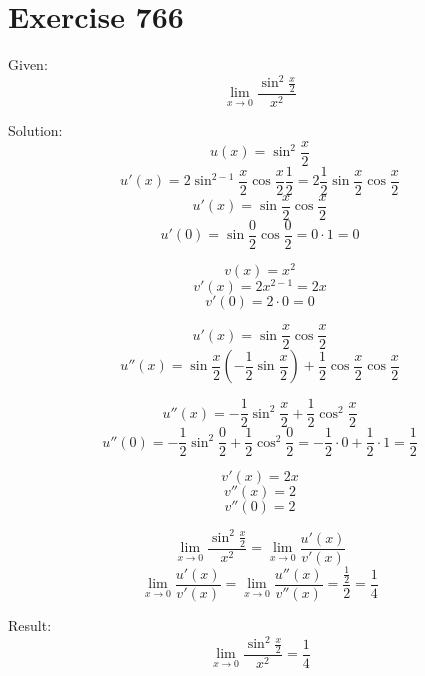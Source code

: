 \documentclass[a4paper, 10pt]{scrartcl}
\begin{document}
\section{Exercise 766}

Given:
\[\lim_{x\to 0}{\frac{\sin^{2}{\frac{x}{2}}}{x^{2}}}\]

Solution:
\[u(x) = \sin^{2}{\frac{x}{2}}\]
\[u'(x) = 2\sin^{2-1}{\frac{x}{2}}\cos{\frac{x}{2}}\frac{1}{2} =
          2\frac{1}{2}\sin{\frac{x}{2}}\cos{\frac{x}{2}}\]
\[u'(x) = \sin{\frac{x}{2}}\cos{\frac{x}{2}}\]
\[u'(0) = \sin{\frac{0}{2}}\cos{\frac{0}{2}} = 0\cdot 1 = 0\]

\[v(x) = x^{2}\]
\[v'(x) = 2x^{2-1} = 2x\]
\[v'(0) = 2\cdot 0 = 0\]

\[u'(x) = \sin{\frac{x}{2}}\cos{\frac{x}{2}}\]
\[u''(x) = \sin{\frac{x}{2}}(-\frac{1}{2}\sin{\frac{x}{2}}) +
           \frac{1}{2}\cos{\frac{x}{2}}\cos{\frac{x}{2}}\]

\[u''(x) = -\frac{1}{2}\sin^{2}{\frac{x}{2}} + \frac{1}{2}\cos^{2}{\frac{x}{2}}\]
\[u''(0) = -\frac{1}{2}\sin^{2}{\frac{0}{2}} + \frac{1}{2}\cos^{2}{\frac{0}{2}} =
           -\frac{1}{2}\cdot 0 + \frac{1}{2}\cdot 1 = \frac{1}{2}\]

\[v'(x) = 2x\]
\[v''(x) = 2\]
\[v''(0) = 2\]

\[\lim_{x\to 0}{\frac{\sin^{2}{\frac{x}{2}}}{x^{2}}} = \lim_{x\to 0}{\frac{u'(x)}{v'(x)}}\]
\[\lim_{x\to 0}{\frac{u'(x)}{v'(x)}} = \lim_{x\to 0}{\frac{u''(x)}{v''(x)}} =
  \frac{\frac{1}{2}}{2} = \frac{1}{4}\]

Result:
\[\lim_{x\to 0}{\frac{\sin^{2}{\frac{x}{2}}}{x^{2}}} = \frac{1}{4}\]
\end{document}
